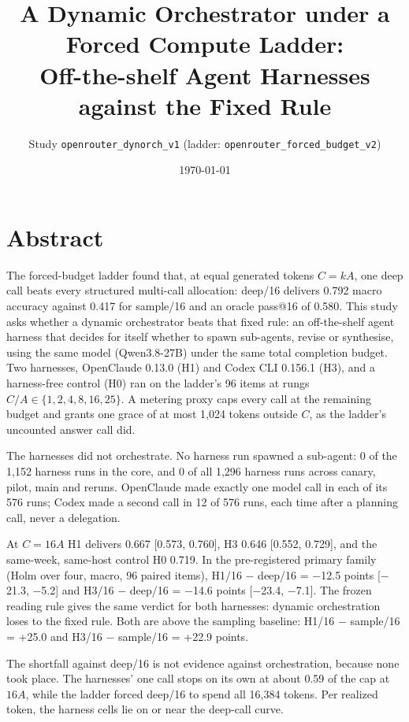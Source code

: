 \documentclass[11pt]{article}
\title{\vspace{-2em}A Dynamic Orchestrator under a Forced Compute Ladder:\\
Off-the-shelf Agent Harnesses against the Fixed Rule}
\author{Study \texttt{openrouter\_dynorch\_v1} (ladder: \texttt{openrouter\_forced\_budget\_v2})}
\date{\today}
\begin{document}
\maketitle
\vspace{-1.5em}

\section*{Abstract}

The forced-budget ladder found that, at equal generated tokens $C = kA$, one deep call beats every structured
multi-call allocation: deep/16 delivers 0.792 macro accuracy against 0.417 for
sample/16 and an oracle pass@16 of 0.580. This study asks whether a dynamic orchestrator beats
that fixed rule: an off-the-shelf agent harness that decides for itself whether to spawn sub-agents, revise or
synthesise, using the same model (Qwen3.8-27B) under the same total completion budget. Two harnesses,
OpenClaude 0.13.0 (H1) and Codex CLI 0.156.1 (H3), and a harness-free control (H0) ran on the
ladder's 96 items at rungs $C/A \in \{1, 2, 4, 8, 16, 25\}$. A metering proxy caps every call at the
remaining budget and grants one grace of at most 1,024 tokens outside $C$, as the ladder's
uncounted answer call did.

The harnesses did not orchestrate. No harness run spawned a sub-agent: 0 of the 1,152
harness runs in the core, and 0 of all 1,296 harness runs across canary, pilot,
main and reruns. OpenClaude made exactly one model call in each of its 576 runs; Codex
made a second call in 12 of 576 runs, each time after
a planning call, never a delegation.

At $C = 16A$ H1 delivers 0.667 [0.573, 0.760], H3
0.646 [0.552, 0.729], and the same-week, same-host control H0
0.719. In the pre-registered primary family (Holm over four, macro, 96 paired items),
H1/16 $-$ deep/16 = $-$12.5 points [$-$21.3,
$-$5.2] and H3/16 $-$ deep/16 = $-$14.6 points
[$-$23.4, $-$7.1]. The frozen reading rule gives the
same verdict for both harnesses: dynamic orchestration loses to the fixed rule. Both are above the sampling baseline:
H1/16 $-$ sample/16 = +25.0 and H3/16 $-$ sample/16 =
+22.9 points.

The shortfall against deep/16 is not evidence against orchestration, because none took place. The harnesses' one
call stops on its own at about 0.59 of the cap at $16A$, while the ladder forced
deep/16 to spend all 16,384 tokens. Per realized token, the harness cells lie on or near the deep-call curve.
\end{document}
